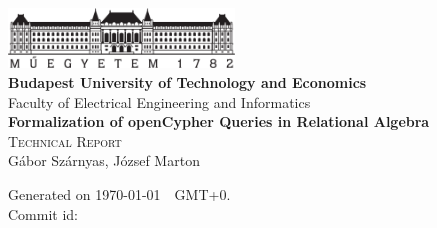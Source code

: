 \begin{titlepage}
	\begin{center}
		\includegraphics[width=60mm,keepaspectratio]{figures/bme-logo}\\
		\vspace{0.3cm}
		\textbf{Budapest University of Technology and Economics}\\
		\textmd{Faculty of Electrical Engineering and Informatics}\\[5cm]
		
		\vspace{0.4cm}
		{\huge \bfseries Formalization of openCypher Queries in Relational Algebra}\\[0.8cm]
		\vspace{0.5cm}
		\textsc{\Large Technical Report}\\[4cm]
		
		{\Large Gábor Szárnyas, József Marton}\\

		
		\vfill
		{\large Generated on \yyyymmdddate \today~\currenttime~GMT+0.}\\[0.5cm]
		
		{\large Commit id: \texttt{}}
	\end{center}		
\end{titlepage}

\addtocounter{page}{1}
